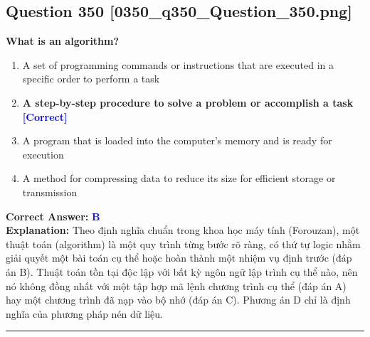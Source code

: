 \documentclass[11pt,a4paper]{article}
\begin{document}
\begin{minipage}{\textwidth}
\subsection*{Question 350 \quad \footnotesize{[0350\_q350\_Question\_350.png]}}
\noindent \textbf{What is an algorithm?}

\begin{enumerate}[label=\Alph*.]
    \item A set of programming commands or instructions that are executed in a specific order to perform a task
    \item \textbf{A step-by-step procedure to solve a problem or accomplish a task} \hfill \textcolor{blue}{\textbf{[Correct]}}
    \item A program that is loaded into the computer's memory and is ready for execution
    \item A method for compressing data to reduce its size for efficient storage or transmission
\end{enumerate}

\noindent \textbf{Correct Answer:} \textcolor{blue}{\textbf{B}} \\[2pt]
\noindent \textbf{Explanation:} Theo định nghĩa chuẩn trong khoa học máy tính (Forouzan), một thuật toán (algorithm) là một quy trình từng bước rõ ràng, có thứ tự logic nhằm giải quyết một bài toán cụ thể hoặc hoàn thành một nhiệm vụ định trước (đáp án B). Thuật toán tồn tại độc lập với bất kỳ ngôn ngữ lập trình cụ thể nào, nên nó không đồng nhất với một tập hợp mã lệnh chương trình cụ thể (đáp án A) hay một chương trình đã nạp vào bộ nhớ (đáp án C). Phương án D chỉ là định nghĩa của phương pháp nén dữ liệu.

\par\vspace{0.3cm}
\hrule
\vspace{0.3cm}
\end{minipage}
\end{document}
